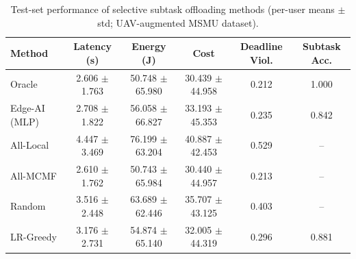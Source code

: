 \begin{table}[t]
\centering
\caption{Test-set performance of selective subtask offloading methods (per-user means $\pm$ std; UAV-augmented MSMU dataset).}
\label{tab:offloading_results}
\begin{tabular}{lccccc}
\hline
Method & Latency (s) & Energy (J) & Cost & Deadline Viol. & Subtask Acc. \\
\hline
Oracle & 2.606 $\pm$ 1.763 & 50.748 $\pm$ 65.980 & 30.439 $\pm$ 44.958 & 0.212 & 1.000 \\
Edge-AI (MLP) & 2.708 $\pm$ 1.822 & 56.058 $\pm$ 66.827 & 33.193 $\pm$ 45.353 & 0.235 & 0.842 \\
All-Local & 4.447 $\pm$ 3.469 & 76.199 $\pm$ 63.204 & 40.887 $\pm$ 42.453 & 0.529 & -- \\
All-MCMF & 2.610 $\pm$ 1.762 & 50.743 $\pm$ 65.984 & 30.440 $\pm$ 44.957 & 0.213 & -- \\
Random & 3.516 $\pm$ 2.448 & 63.689 $\pm$ 62.446 & 35.707 $\pm$ 43.125 & 0.403 & -- \\
LR-Greedy & 3.176 $\pm$ 2.731 & 54.874 $\pm$ 65.140 & 32.005 $\pm$ 44.319 & 0.296 & 0.881 \\
\hline
\end{tabular}
\end{table}
